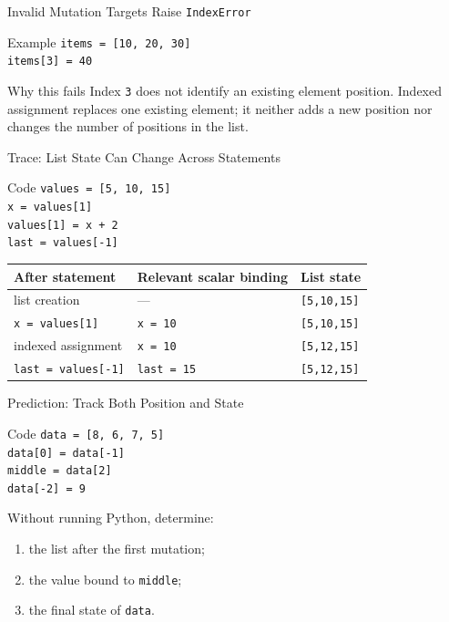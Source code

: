 \documentclass[aspectratio=169,10pt]{beamer}
\begin{document}
\begin{frame}{Invalid Mutation Targets Raise \texttt{IndexError}}
  \begin{block}{Example}
    \texttt{items = [10, 20, 30]}\\[0.08in]
    \texttt{items[3] = 40}
  \end{block}

  \begin{alertblock}{Why this fails}
    Index \texttt{3} does not identify an existing element position. Indexed assignment replaces one existing element; it neither adds a new position nor changes the number of positions in the list.
  \end{alertblock}
\end{frame}

\begin{frame}{Trace: List State Can Change Across Statements}
  \begin{block}{Code}
    \texttt{values = [5, 10, 15]}\\
    \texttt{x = values[1]}\\
    \texttt{values[1] = x + 2}\\
    \texttt{last = values[-1]}
  \end{block}

  \begin{center}
    \renewcommand{\arraystretch}{1.25}
    \begin{tabular}{l|l|l}
      \textbf{After statement} & \textbf{Relevant scalar binding} & \textbf{List state} \\\hline
      list creation & --- & \texttt{[5,10,15]} \\
      \texttt{x = values[1]} & \texttt{x = 10} & \texttt{[5,10,15]} \\
      indexed assignment & \texttt{x = 10} & \texttt{[5,12,15]} \\
      \texttt{last = values[-1]} & \texttt{last = 15} & \texttt{[5,12,15]}
    \end{tabular}
  \end{center}
\end{frame}

\begin{frame}{Prediction: Track Both Position and State}
  \begin{block}{Code}
    \texttt{data = [8, 6, 7, 5]}\\
    \texttt{data[0] = data[-1]}\\
    \texttt{middle = data[2]}\\
    \texttt{data[-2] = 9}
  \end{block}

  \begin{activity}
    Without running Python, determine:
    \begin{enumerate}
      \item the list after the first mutation;
      \item the value bound to \texttt{middle};
      \item the final state of \texttt{data}.
    \end{enumerate}
  \end{activity}
\end{frame}
\end{document}
